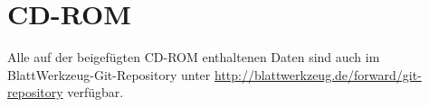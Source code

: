 \chapter{CD-ROM}
\label{sec:exercises}

Alle auf der beigefügten CD-ROM enthaltenen Daten sind auch im BlattWerkzeug-Git-Repository unter \url{http://blattwerkzeug.de/forward/git-repository} verfügbar.

